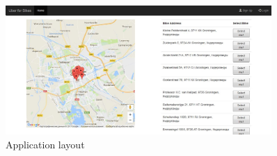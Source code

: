 \begin{figure}[H]
		\centering
		\includegraphics[width=0.9\textwidth]{images/screenshot.png}
		\caption{Application layout}
		\label{front-end}
	\end{figure}
